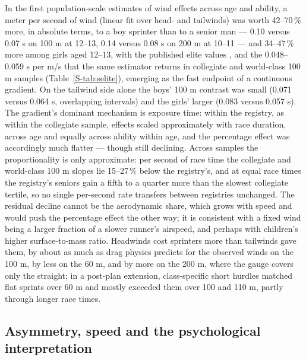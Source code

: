 \documentclass[12pt,a4paper]{article}
\begin{document}
In the first population-scale estimates of wind effects across age and ability, a meter per second of wind (linear fit over head- and tailwinds) was worth 42--70\,\% more, in absolute terms, to a boy sprinter than to a senior man --- 0.10 versus 0.07 s on 100 m at 12--13, 0.14 versus 0.08 s on 200 m at 10--11 --- and 34--47\,\% more among girls aged 12--13, with the published elite values \citep{linthorne1994,mureika2001,moinat2018,hollings2012}, and the 0.048--0.059 s per m/s that the same estimator returns in collegiate and world-class 100 m samples (Table~\ref{S-tab:selite}), emerging as the fast endpoint of a continuous gradient. On the tailwind side alone the boys' 100 m contrast was small (0.071 versus 0.064 s, overlapping intervals) and the girls' larger (0.083 versus 0.057 s). The gradient's dominant mechanism is exposure time: within the registry, as within the collegiate sample, effects scaled approximately with race duration, across age and equally across ability within age, and the percentage effect was accordingly much flatter --- though still declining. Across samples the proportionality is only approximate: per second of race time the collegiate and world-class 100 m slopes lie 15--27\,\% below the registry's, and at equal race times the registry's seniors gain a fifth to a quarter more than the slowest collegiate tertile, so no single per-second rate transfers between registries unchanged. The residual decline cannot be the aerodynamic share, which grows with speed and would push the percentage effect the other way; it is consistent with a fixed wind being a larger fraction of a slower runner's airspeed, and perhaps with children's higher surface-to-mass ratio. Headwinds cost sprinters more than tailwinds gave them, by about as much as drag physics predicts for the observed winds on the 100 m, by less on the 60 m, and by more on the 200 m, where the gauge covers only the straight; in a post-plan extension, class-specific short hurdles matched flat sprints over 60 m and mostly exceeded them over 100 and 110 m, partly through longer race times.

\subsection{Asymmetry, speed and the psychological interpretation}
\end{document}
